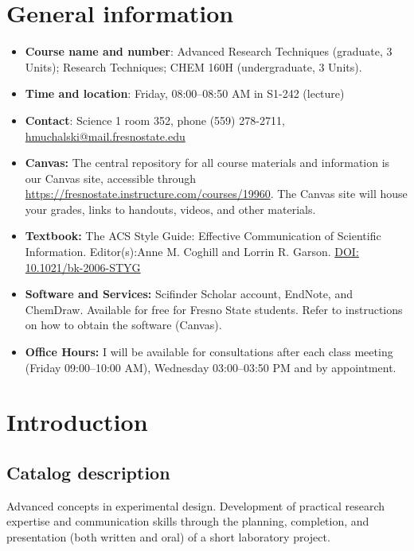 \hypertarget{general-information}{%
\section{General information}\label{general-information}}

\begin{itemize}
\tightlist
\item
  \textbf{Course name and number}: Advanced Research Techniques
  (graduate, 3 Units); Research Techniques; CHEM 160H (undergraduate, 3
  Units).
\item
  \textbf{Time and location}: Friday, 08:00--08:50 AM in S1-242
  (lecture)
\item
  \textbf{Contact}: Science 1 room 352, phone (559) 278-2711,
  \url{hmuchalski@mail.fresnostate.edu}
\item
  \textbf{Canvas:} The central repository for all course materials and
  information is our Canvas site, accessible through
  \url{https://fresnostate.instructure.com/courses/19960}. The Canvas
  site will house your grades, links to handouts, videos, and other
  materials.
\item
  \textbf{Textbook:} The ACS Style Guide: Effective Communication of
  Scientific Information. Editor(s):Anne M. Coghill and Lorrin R.
  Garson.
  \href{http://login.hmlproxy.lib.csufresno.edu/login?url=http://dx.doi.org/10.1021/bk-2006-STYG}{DOI:
  10.1021/bk-2006-STYG}
\item
  \textbf{Software and Services:} Scifinder Scholar account, EndNote,
  and ChemDraw. Available for free for Fresno State students. Refer to
  instructions on how to obtain the software (Canvas).
\item
  \textbf{Office Hours:} I will be available for consultations after
  each class meeting (Friday 09:00--10:00 AM), Wednesday 03:00--03:50 PM
  and by appointment.
\end{itemize}

\hypertarget{introduction}{%
\section{Introduction}\label{introduction}}

\hypertarget{catalog-description}{%
\subsection{Catalog description}\label{catalog-description}}

Advanced concepts in experimental design. Development of practical
research expertise and communication skills through the planning,
completion, and presentation (both written and oral) of a short
laboratory project.

